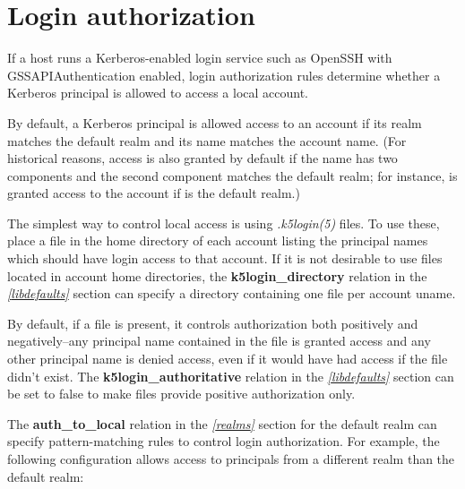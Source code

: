 \documentclass[letterpaper,10pt,english]{sphinxmanual}
\begin{document}
\section{Login authorization}
\label{admin/host_config:login-authorization}\label{admin/host_config:id1}
If a host runs a Kerberos-enabled login service such as OpenSSH with
GSSAPIAuthentication enabled, login authorization rules determine
whether a Kerberos principal is allowed to access a local account.

By default, a Kerberos principal is allowed access to an account if
its realm matches the default realm and its name matches the account
name.  (For historical reasons, access is also granted by default if
the name has two components and the second component matches the
default realm; for instance, 
is granted access to the  account if  is
the default realm.)

The simplest way to control local access is using \emph{.k5login(5)}
files.  To use these, place a  file in the home directory
of each account listing the principal names which should have login
access to that account.  If it is not desirable to use 
files located in account home directories, the \textbf{k5login\_directory}
relation in the {\hyperref[admin/conf_files/krb5_conf:libdefaults]{\emph{{[}libdefaults{]}}}} section can specify a directory
containing one file per account uname.

By default, if a  file is present, it controls
authorization both positively and negatively--any principal name
contained in the file is granted access and any other principal name
is denied access, even if it would have had access if the 
file didn't exist.  The \textbf{k5login\_authoritative} relation in the
{\hyperref[admin/conf_files/krb5_conf:libdefaults]{\emph{{[}libdefaults{]}}}} section can be set to false to make 
files provide positive authorization only.

The \textbf{auth\_to\_local} relation in the {\hyperref[admin/conf_files/krb5_conf:realms]{\emph{{[}realms{]}}}} section for the
default realm can specify pattern-matching rules to control login
authorization.  For example, the following configuration allows access
to principals from a different realm than the default realm:
\end{document}
